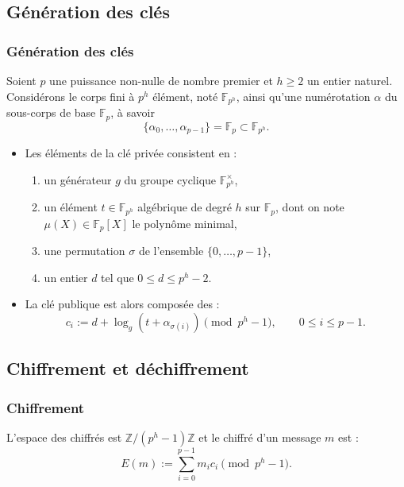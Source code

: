 \documentclass{beamer}
\theoremstyle{definition}
\theoremstyle{remark}
\def\Z{\mathbb Z}
\def\gf #1{\mathbb{F}_{#1}}
\begin{document}
\subsection{Génération des clés}
\begin{frame}
  \frametitle{Génération des clés}
  Soient $p$ une puissance non-nulle de nombre premier et $h \geqslant 2$ un entier naturel. Considérons le corps fini à $p^h$ élément, noté $\gf{p^h}$, ainsi qu'une numérotation $\alpha$ du sous-corps de base $\gf{p}$, à savoir $$\{\alpha_0,\dots, \alpha_{p-1}\} = \gf{p} \subset \gf{p^h}.$$

  \begin{itemize}
  \item Les éléments de la clé privée consistent en :
    \begin{enumerate}
    \item un générateur $g$ du groupe cyclique $\gf{p^h}^\times$,
    \item un élément $t \in \gf{p^h}$ algébrique de degré $h$ sur $\gf{p}$, dont on note $\mu(X) \in \gf{p}[X]$ le polynôme minimal,
    \item une permutation $\sigma$ de l'ensemble $\{0, \dots, p-1\}$,
    \item un entier $d$ tel que $0 \leqslant d \leqslant p^h-2$.
    \end{enumerate}
  \item La clé publique est alors composée des :
    $$c_i := d + \log_g\left(t + \alpha_{\sigma(i)}\right) \pmod{p^h-1}, \qquad 0 \leqslant i \leqslant p-1.$$
  \end{itemize}
\end{frame}

\subsection{Chiffrement et déchiffrement}
\begin{frame}
  \frametitle{Chiffrement}
  L'espace des chiffrés est $\Z/(p^h-1)\Z$ et le chiffré d'un message $m$ est :
$$E(m) := \sum_{i=0}^{p-1} m_ic_i \pmod{p^h-1}.$$
\end{frame}
\end{document}
